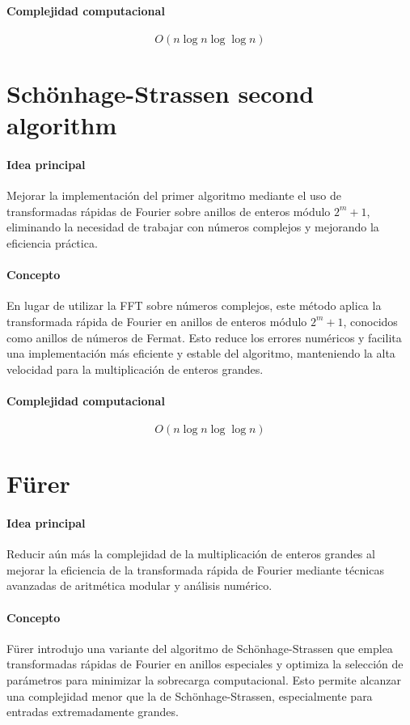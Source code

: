 \paragraph{Complejidad computacional} 
\[
    O\left(n \log n \log \log n\right)
\]

\section{Sch\"onhage-Strassen second algorithm} 

\paragraph{Idea principal} 
Mejorar la implementación del primer algoritmo mediante el uso de transformadas rápidas de Fourier sobre anillos de enteros módulo \(2^{m}+1\), eliminando la necesidad de trabajar con números complejos y mejorando la eficiencia práctica.

\paragraph{Concepto} 
En lugar de utilizar la FFT sobre números complejos, este método aplica la transformada rápida de Fourier en anillos de enteros módulo \(2^{m}+1\), conocidos como anillos de números de Fermat. Esto reduce los errores numéricos y facilita una implementación más eficiente y estable del algoritmo, manteniendo la alta velocidad para la multiplicación de enteros grandes.

\paragraph{Complejidad computacional} 
\[
    O\left(n \log n \log \log n\right)
\]

\section{F\"urer}

\paragraph{Idea principal} 
Reducir aún más la complejidad de la multiplicación de enteros grandes al mejorar la eficiencia de la transformada rápida de Fourier mediante técnicas avanzadas de aritmética modular y análisis numérico.

\paragraph{Concepto} 
F\"urer introdujo una variante del algoritmo de Sch\"onhage-Strassen que emplea transformadas rápidas de Fourier en anillos especiales y optimiza la selección de parámetros para minimizar la sobrecarga computacional. Esto permite alcanzar una complejidad menor que la de Sch\"onhage-Strassen, especialmente para entradas extremadamente grandes.

